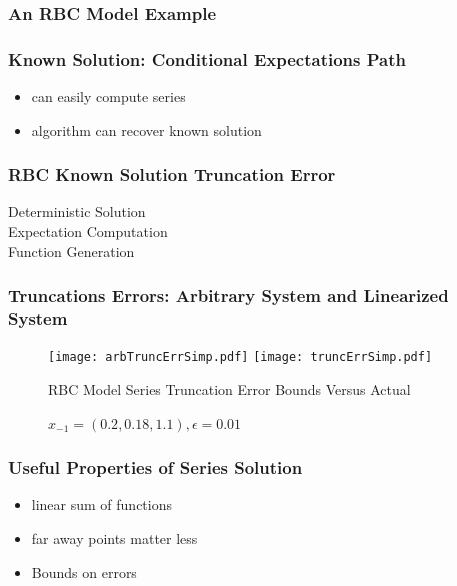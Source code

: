 \documentclass[tikz]{beamer}
\begin{document}
\begin{frame}
\frametitle{An RBC Model Example}
\end{frame}
\begin{frame}
\frametitle{Known Solution: Conditional Expectations Path}
\begin{itemize}
\item can easily compute series
\item algorithm can recover known solution
\end{itemize}


\end{frame}




\begin{frame}
  \frametitle{RBC Known Solution Truncation Error }
  \begin{description}
  \item[Deterministic Solution] 
  \item[Expectation Computation] 
\item[Function Generation]
  \end{description}

\end{frame}


  \begin{frame}
    \frametitle{Truncations Errors: Arbitrary System and Linearized System}


\begin{figure}[H]
  \centering
\texttt{[image: arbTruncErrSimp.pdf]}  
\texttt{[image: truncErrSimp.pdf]}  
\caption{RBC Model Series Truncation Error Bounds Versus Actual}
  \caption{ $x_{-1}=( {{0.2}, {0.18}, {1.1}}), \epsilon=0.01$} \label{arbFig}
\end{figure}


  \end{frame}


\begin{frame}
\frametitle{Useful Properties of Series Solution}

\begin{itemize}
\item linear sum of functions
\item far away points matter less
\item Bounds on errors
\end{itemize}



\end{frame}
\end{document}
